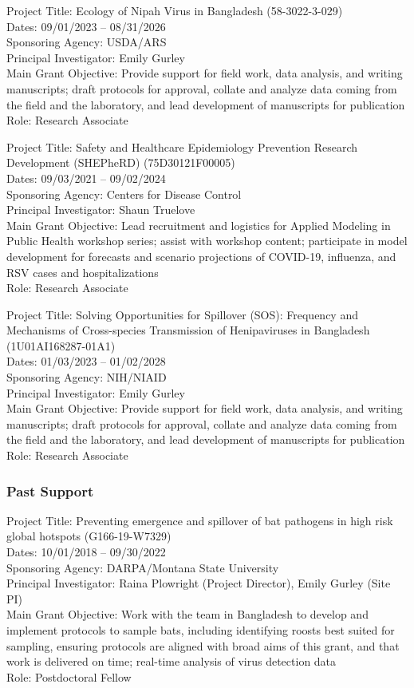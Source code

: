 \documentclass{cv}
\begin{document}
Project Title: Ecology of Nipah Virus in Bangladesh (58-3022-3-029) \\
Dates: 09/01/2023 -- 08/31/2026 \\
Sponsoring Agency: USDA/ARS \\
Principal Investigator: Emily Gurley \\
Main Grant Objective: Provide support for field work, data analysis, and writing manuscripts; draft protocols for approval, collate and analyze data coming from the field and the laboratory, and lead development of manuscripts for publication \\
Role: Research Associate

Project Title: Safety and Healthcare Epidemiology Prevention Research Development (SHEPheRD) (75D30121F00005) \\
Dates: 09/03/2021 -- 09/02/2024 \\
Sponsoring Agency: Centers for Disease Control \\
Principal Investigator: Shaun Truelove \\
Main Grant Objective: Lead recruitment and logistics for Applied Modeling in Public Health workshop series; assist with workshop content; participate in model development for forecasts and scenario projections of COVID-19, influenza, and RSV cases and hospitalizations \\
Role: Research Associate

Project Title: Solving Opportunities for Spillover (SOS): Frequency and Mechanisms of Cross-species Transmission of Henipaviruses in Bangladesh (1U01AI168287-01A1) \\
Dates: 01/03/2023 -- 01/02/2028 \\
Sponsoring Agency: NIH/NIAID \\
Principal Investigator: Emily Gurley \\
Main Grant Objective: Provide support for field work, data analysis, and writing manuscripts; draft protocols for approval, collate and analyze data coming from the field and the laboratory, and lead development of manuscripts for publication \\
Role: Research Associate

\subsubsection*{Past Support}

Project Title: Preventing emergence and spillover of bat pathogens in high risk global hotspots (G166-19-W7329) \\
Dates: 10/01/2018 -- 09/30/2022 \\
Sponsoring Agency: DARPA/Montana State University \\
Principal Investigator: Raina Plowright (Project Director), Emily Gurley (Site PI) \\
Main Grant Objective: Work with the team in Bangladesh to develop and implement protocols to sample bats, including identifying roosts best suited for sampling, ensuring protocols are aligned with broad aims of this grant, and that work is delivered on time; real-time analysis of virus detection data \\
Role: Postdoctoral Fellow
\end{document}
